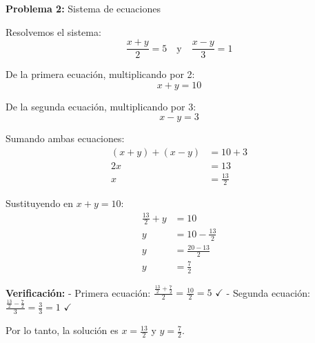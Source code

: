 \textbf{Problema 2:} Sistema de ecuaciones

Resolvemos el sistema:
$$\frac{x+y}{2} = 5 \quad \text{y} \quad \frac{x-y}{3} = 1$$

De la primera ecuación, multiplicando por 2:
$$x + y = 10$$

De la segunda ecuación, multiplicando por 3:
$$x - y = 3$$

Sumando ambas ecuaciones:
\begin{align}
(x + y) + (x - y) &= 10 + 3\\
2x &= 13\\
x &= \frac{13}{2}
\end{align}

Sustituyendo en $x + y = 10$:
\begin{align}
\frac{13}{2} + y &= 10\\
y &= 10 - \frac{13}{2}\\
y &= \frac{20 - 13}{2}\\
y &= \frac{7}{2}
\end{align}

\textbf{Verificación:}
- Primera ecuación: $\frac{\frac{13}{2} + \frac{7}{2}}{2} = \frac{10}{2} = 5$ $\checkmark$
- Segunda ecuación: $\frac{\frac{13}{2} - \frac{7}{2}}{3} = \frac{3}{3} = 1$ $\checkmark$

Por lo tanto, la solución es $x = \frac{13}{2}$ y $y = \frac{7}{2}$.